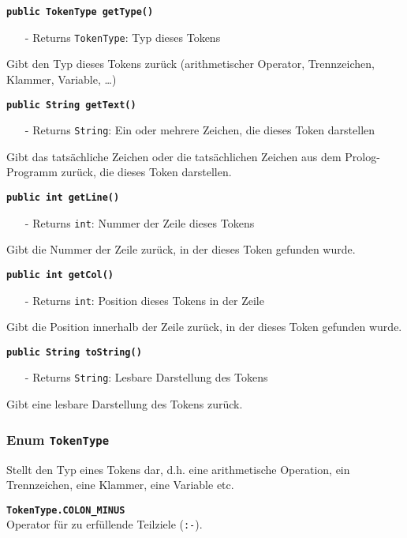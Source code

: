 \documentclass[parskip=full,11pt,twoside]{scrartcl}
\begin{document}
\textbf{\texttt{public TokenType getType()}}
\begin{itemize}[noitemsep]
	\item[-] Returns \texttt{TokenType}: Typ dieses Tokens
\end{itemize}
Gibt den Typ dieses Tokens zurück (arithmetischer Operator, Trennzeichen, Klammer, Variable, \dots)

\textbf{\texttt{public String getText()}}
\begin{itemize}[noitemsep]
	\item[-] Returns \texttt{String}: Ein oder mehrere Zeichen, die dieses Token darstellen
\end{itemize}
Gibt das tatsächliche Zeichen oder die tatsächlichen Zeichen aus dem Prolog-Programm zurück, die dieses Token darstellen.

\textbf{\texttt{public int getLine()}}
\begin{itemize}[noitemsep]
	\item[-] Returns \texttt{int}: Nummer der Zeile dieses Tokens
\end{itemize}
Gibt die Nummer der Zeile zurück, in der dieses Token gefunden wurde.

\textbf{\texttt{public int getCol()}}
\begin{itemize}[noitemsep]
	\item[-] Returns \texttt{int}: Position dieses Tokens in der Zeile
\end{itemize}
Gibt die Position innerhalb der Zeile zurück, in der dieses Token gefunden wurde.

\textbf{\texttt{public String toString()}}
\begin{itemize}[noitemsep]
	\item[-] Returns \texttt{String}: Lesbare Darstellung des Tokens
\end{itemize}
Gibt eine lesbare Darstellung des Tokens zurück.

\subsubsection{Enum \texttt{TokenType}}

Stellt den Typ eines Tokens dar, d.h. eine arithmetische Operation, ein Trennzeichen, eine Klammer, eine Variable etc.

\textbf{\texttt{TokenType.COLON\_MINUS}}\\
Operator für zu erfüllende Teilziele (\texttt{:-}).
\end{document}
